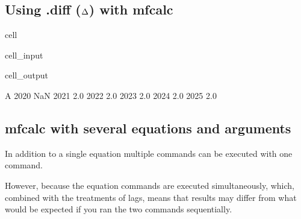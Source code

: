 \documentclass[letterpaper,10pt,english]{jupyterBook}
\begin{document}
\subsection{Using .diff (\protect\(\Delta\protect\)) with mfcalc}
\label{\detokenize{content/04_PythonEssentials/ExtendingDataFrames:using-diff-delta-with-mfcalc}}
\begin{sphinxuseclass}{cell}\begin{sphinxVerbatimInput}

\begin{sphinxuseclass}{cell_input}
\begin{sphinxVerbatim}[commandchars=\\\{\}]
   
                      
\end{sphinxVerbatim}

\end{sphinxuseclass}\end{sphinxVerbatimInput}
\begin{sphinxVerbatimOutput}

\begin{sphinxuseclass}{cell_output}
\begin{sphinxVerbatim}[commandchars=\\\{\}]
        A
2020  NaN
2021  2.0
2022  2.0
2023  2.0
2024  2.0
2025  2.0
\end{sphinxVerbatim}

\end{sphinxuseclass}\end{sphinxVerbatimOutput}

\end{sphinxuseclass}

\subsection{mfcalc with several equations and arguments}
\label{\detokenize{content/04_PythonEssentials/ExtendingDataFrames:mfcalc-with-several-equations-and-arguments}}
\sphinxAtStartPar
In addition to a single equation multiple commands can be executed with one command.

\sphinxAtStartPar
However,  because the equation commands are executed simultaneously, which, combined with the treatments of lags, means that results may differ from what would be expected if you ran the two commands sequentially.
\end{document}
